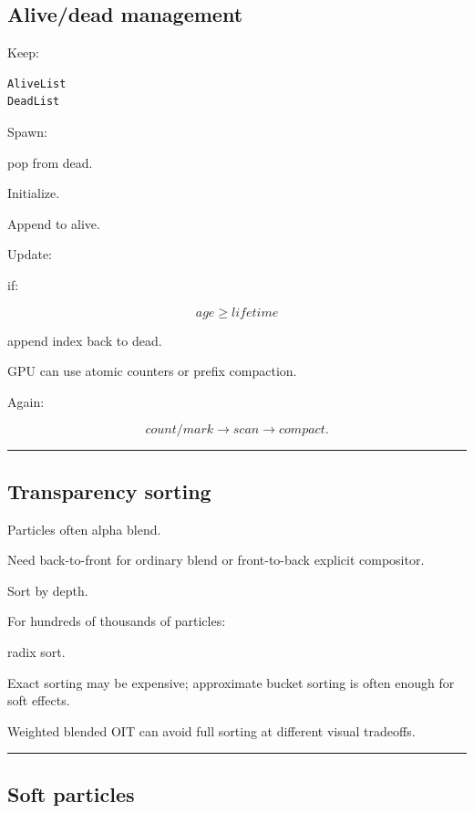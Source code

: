 \subsection{Alive/dead management}\label{04-visual-computing-ii-ch040-alivedead-management}

Keep:

\begin{verbatim}
AliveList
DeadList
\end{verbatim}

Spawn:

pop from dead.

Initialize.

Append to alive.

Update:

if:

\[
age\ge lifetime
\]

append index back to dead.

GPU can use atomic counters or prefix compaction.

Again:

\[
count/mark
\rightarrow
scan
\rightarrow
compact.
\]

\begin{center}\rule{0.5\linewidth}{0.5pt}\end{center}

\subsection{Transparency sorting}\label{04-visual-computing-ii-ch040-transparency-sorting}

Particles often alpha blend.

Need back-to-front for ordinary blend or front-to-back explicit compositor.

Sort by depth.

For hundreds of thousands of particles:

radix sort.

Exact sorting may be expensive; approximate bucket sorting is often enough for soft effects.

Weighted blended OIT can avoid full sorting at different visual tradeoffs.

\begin{center}\rule{0.5\linewidth}{0.5pt}\end{center}

\subsection{Soft particles}\label{04-visual-computing-ii-ch040-soft-particles}


